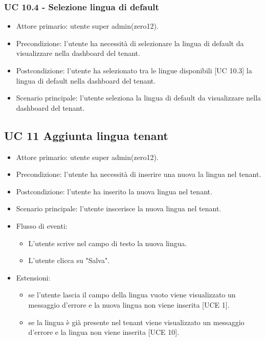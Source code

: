     \subsubsection{UC 10.4 - Selezione lingua di default}
        \begin{itemize}
            \item Attore primario: utente super admin(zero12).
            \item Precondizione: l'utente ha necessità di selezionare la lingua di default da visualizzare nella dashboard del tenant.
            \item Postcondizione: l'utente ha selezionato tra le lingue disponibili [UC 10.3] la lingua di default nella dashboard del tenant.
            \item Scenario principale: l'utente seleziona la lingua di default da visualizzare nella dashboard del tenant.
        \end{itemize}
\subsection{UC 11 Aggiunta lingua tenant}
    \begin{itemize}
        \item Attore primario: utente super admin(zero12).
        \item Precondizione: l'utente ha necessità di inserire una nuova la lingua nel tenant.
        \item Postcondizione: l'utente ha inserito la nuova lingua nel tenant.
        \item Scenario principale: l'utente inscerisce la nuova lingua nel tenant.
        \item Flusso di eventi:
            \begin{itemize}
                \item L'utente scrive nel campo di testo la nuova lingua.
                \item L'utente clicca su "Salva".
            \end{itemize}
        \item Estensioni:
            \begin{itemize}
                \item se l'utente lascia il campo della lingua vuoto viene visualizzato un messaggio d'errore e la nuova lingua non viene inserita [UCE 1].
                \item se la lingua è già presente nel tenant viene visualizzato un messaggio d'errore e la lingua non viene inserita [UCE 10].
            \end{itemize}
        \end{itemize}
